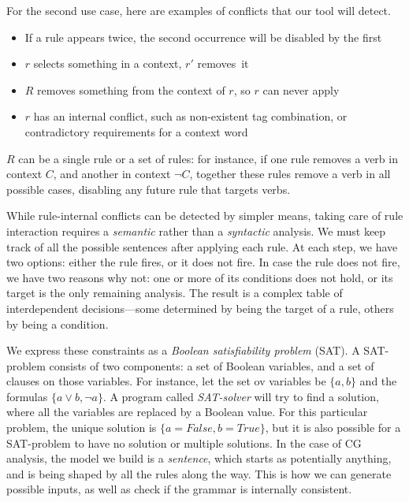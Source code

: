 
For the second use case, here are examples of conflicts that our tool will detect.
\begin{itemize}
\item If a rule appears twice, the second occurrence will be disabled by the first
\item $r$ selects something in a context, $r'$ removes~it
\item $R$ removes something from the context of $r$, so $r$ can never
  apply
\item $r$ has an internal conflict, such as non-existent
tag combination, or contradictory requirements for a context word
\end{itemize}
$R$ can be a single rule or a set of rules: for instance, if one rule removes a verb in
context $C$, and another in context $\neg C$, together these rules
remove a verb in all possible cases, disabling any future rule that
targets verbs.

While rule-internal conflicts can be detected by simpler means, taking
care of rule interaction requires a {\em semantic} rather than a {\em
 syntactic} analysis.
We must keep track of all the possible sentences after applying each
rule. At each step, we have two options: either the rule fires,
or it does not fire. In case the rule does not fire, we have two
reasons why not: one or more of its conditions does not hold, or its
target is the only remaining analysis. The result is a complex table
of interdependent decisions---some determined by being the target of a
rule, others by being a condition.

We express these constraints as a \emph{Boolean satisfiability problem} (SAT).
A SAT-problem consists of two components: a set of Boolean variables, and a set
of clauses on those variables. For instance, let the set ov variables
be $\{a, b\}$ and the formulas $\{a \vee b, \neg{}a\}$. A program called
\emph{SAT-solver} will try to find a solution, where all the variables
are replaced by a Boolean value. For this particular problem, the
unique solution is $\{a=False, b=True\}$, but it is also possible for a
SAT-problem to have no solution or multiple solutions.
In the case of CG analysis, the model we build is a \emph{sentence},
which starts as potentially anything, and is being shaped by all the
rules along the way. This is how we can generate possible inputs, as
well as check if the grammar is internally consistent.


